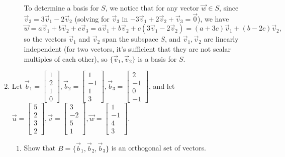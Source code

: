 \documentclass[12pt]{article}
\newcommand{\bbm}{\begin{bmatrix}}
\newcommand{\ebm}{\end{bmatrix}}
\begin{document}
\begin{enumerate}
\begin{enumerate}
To determine a basis for $S$, we notice that for any vector $\vec{w}\in S$, since $\vec{v}_3 = 3\vec{v}_1-2\vec{v}_2$ (solving for $\vec{v}_3$ in $-3\vec{v}_1+2\vec{v}_2+\vec{v}_3=\vec{0}$), we have
\[
 \vec{w} = a\vec{v}_1+b\vec{v}_2+c\vec{v}_3 = a\vec{v}_1+b\vec{v}_2+c(3\vec{v}_1-2\vec{v}_2) = (a+3c)\vec{v}_1+(b-2c)\vec{v}_2,
\]
so the vectors $\vec{v}_1$ and $\vec{v}_2$ span the subspace $S$, and $\vec{v}_1, \vec{v}_2$ are linearly independent (for two vectors, it's sufficient that they are not scalar multiples of each other), so $\{\vec{v}_1,\vec{v}_2\}$ is a basis for $S$.
\end{enumerate}

\bigskip




 \item Let $\vec{b}_1= \bbm 1\\2\\1\\0\ebm, \vec{b}_2 =  \bbm 1\\-1\\1\\3\ebm, \vec{b}_3 =  \bbm 2\\-1\\0\\-1\ebm$, and let $\vec{u} = \bbm 5\\2\\3\\2\ebm, \vec{v} = \bbm 3\\-2\\5\\1\ebm, \vec{w} = \bbm 1\\-1\\4\\3\ebm$.
\begin{enumerate}
 \item Show that $B=\{\vec{b}_1,\vec{b}_2,\vec{b}_3\}$ is an orthogonal set of vectors.
 

\end{enumerate}
\end{enumerate}
\end{document}
